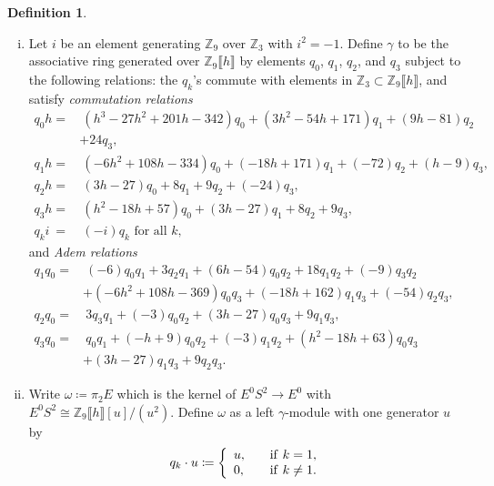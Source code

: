 \documentclass{gtpart}
\theoremstyle{definition}
\newtheorem{defn}[thm]{Definition}
\theoremstyle{remark}
\newcommand{\mb}[1]{\mathbb{#1}}
\newcommand{\BZ}{{\mb Z}}
\newcommand{\g}{\gamma}
\newcommand{\ce}{\coloneqq}
\numberwithin{equation}{section}
\numberwithin{thm}{section}
\begin{document}
\begin{defn}
\label{def:go}
 \mbox{}
 \begin{enumerate}[(i)]
  \item \label{go(i)} Let $i$ be an element generating $\BZ_9$ over 
  $\BZ_3$ with $i^2 = -1$.  Define $\g$ to be the associative ring 
  generated over $\BZ_9 \llbracket h \rrbracket$ by elements $q_0$, 
  $q_1$, $q_2$, and $q_3$ subject to the following relations: the 
  $q_k$'s commute with elements in 
  $\BZ_3 \subset \BZ_9 \llbracket h \rrbracket$, and satisfy 
  {\em commutation relations} 
  \begin{equation*}
  \begin{split}
   q_0 h = & ~ (h^3 - 27 h^2 + 201 h - 342) q_0 + (3 h^2 - 54 h + 171) q_1 + (9 h - 81) q_2 \\
           & + 24 q_3, \\
   q_1 h = & ~ (-6 h^2 + 108 h - 334) q_0 + (-18 h + 171) q_1 + (-72) q_2 + (h - 9) q_3, \\
   q_2 h = & ~ (3 h - 27) q_0 + 8 q_1 + 9 q_2 + (-24) q_3, \\
   q_3 h = & ~ (h^2 - 18 h + 57) q_0 + (3 h - 27) q_1 + 8 q_2 + 9 q_3, \\
   q_k i ~ = & ~ (-i) q_k \text{~for all~} k, 
  \end{split}
  \end{equation*}
  and {\em Adem relations} 
  \begin{equation*}
  \begin{split}
   q_1q_0 = & ~ (-6) q_0q_1 + 3 q_2q_1 + (6 h - 54) q_0q_2 + 18 q_1q_2 + (-9) q_3q_2 \\
            & + (-6 h^2 + 108 h - 369) q_0q_3 + (-18 h + 162) q_1q_3 + (-54) q_2q_3, \quad~~ \\
   q_2q_0 = & ~ 3 q_3q_1 + (-3) q_0q_2 + (3 h - 27) q_0q_3 + 9 q_1q_3, \\
   q_3q_0 = & ~ q_0q_1 + (-h + 9) q_0q_2 + (-3) q_1q_2 + (h^2 - 18 h + 63) q_0q_3 \\
            & + (3 h - 27) q_1q_3 + 9 q_2q_3.  
  \end{split}
  \end{equation*}

  \item \label{go(ii)} Write $\omega \ce \pi_2 E$ which is the kernel 
  of $E^0 S^2 \to E^0$ with 
  $E^0 S^2 \cong \BZ_9 \llbracket h \rrbracket [u] / (u^2)$.  Define 
  $\omega$ as a left $\g$-module with one generator $u$ by 
  \[
   q_k \cdot u \ce \left\{
   \begin{array}{ll}
     u,  & \quad {\rm if}~k = 1, \\
     0,  & \quad {\rm if}~k \neq 1.  
   \end{array}
   \right.
  \]
 \end{enumerate}
\end{defn}
\end{document}

